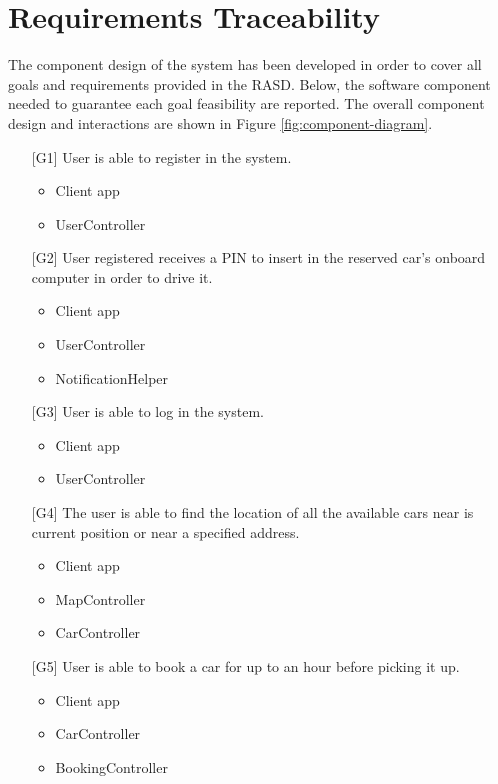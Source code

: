 \chapter{Requirements Traceability}
The component design of the system has been developed in order to cover all goals and requirements provided in the RASD. Below, the software component needed to guarantee each goal feasibility are reported.
The overall component design and interactions are shown in Figure \ref{fig:component-diagram}.

\begin{itemize}
	\item[{[G1]}] User is able to register in the system.
		\begin{itemize}
			\item Client app
			\item UserController
		\end{itemize}
	\item[{[G2]}] User registered receives a PIN to insert in the reserved car's onboard computer in order to drive it.
		\begin{itemize}
			\item Client app
			\item UserController
			\item NotificationHelper
		\end{itemize}
	\item[{[G3]}] User is able to log in the system.
		\begin{itemize}
			\item Client app
			\item UserController
		\end{itemize}
	\item[{[G4]}] The user is able to find the location of all the available cars near is current position or near a specified address.
		\begin{itemize}
			\item Client app
			\item MapController
			\item CarController
		\end{itemize}
	\item[{[G5]}] User is able to book a car for up to an hour before picking it up.
		\begin{itemize}
			\item Client app
			\item CarController
			\item BookingController
		\end{itemize}

\end{itemize}
